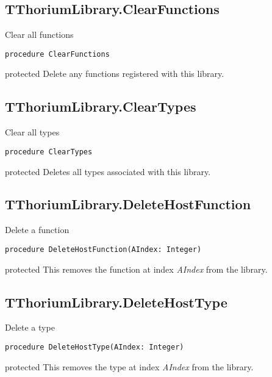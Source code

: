 \subsection{TThoriumLibrary.ClearFunctions}
\label{thoriumcorepkg:thorium:tthoriumlibrary:clearfunctions}
\begin{FPCList}
\Synopsis
Clear all functions\Declaration 

\begin{verbatim}
procedure ClearFunctions
\end{verbatim}
\Visibility
protected
\Description
Delete any functions registered with this library.\end{FPCList}
\subsection{TThoriumLibrary.ClearTypes}
\label{thoriumcorepkg:thorium:tthoriumlibrary:cleartypes}
\begin{FPCList}
\Synopsis
Clear all types\Declaration 

\begin{verbatim}
procedure ClearTypes
\end{verbatim}
\Visibility
protected
\Description
Deletes all types associated with this library.\end{FPCList}
\subsection{TThoriumLibrary.DeleteHostFunction}
\label{thoriumcorepkg:thorium:tthoriumlibrary:deletehostfunction}
\begin{FPCList}
\Synopsis
Delete a function\Declaration 

\begin{verbatim}
procedure DeleteHostFunction(AIndex: Integer)
\end{verbatim}
\Visibility
protected
\Description
This removes the function at index \textit{AIndex} from the library.\end{FPCList}
\subsection{TThoriumLibrary.DeleteHostType}
\label{thoriumcorepkg:thorium:tthoriumlibrary:deletehosttype}
\begin{FPCList}
\Synopsis
Delete a type\Declaration 

\begin{verbatim}
procedure DeleteHostType(AIndex: Integer)
\end{verbatim}
\Visibility
protected
\Description
This removes the type at index \textit{AIndex} from the library.\end{FPCList}
